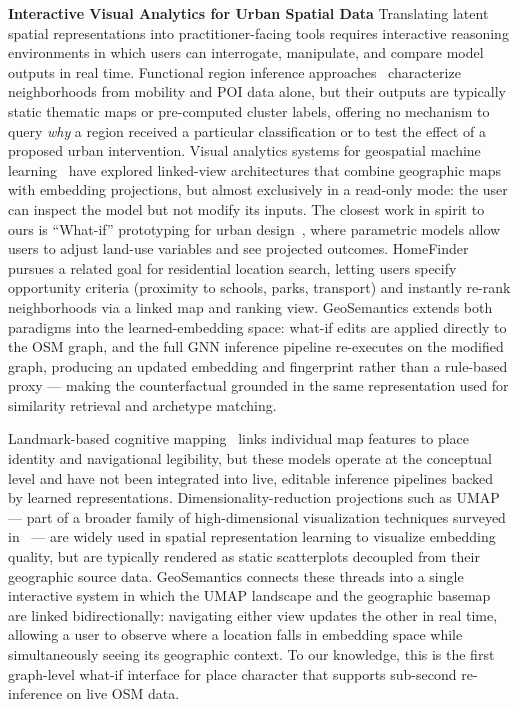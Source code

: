 \documentclass[]{interact}
\theoremstyle{plain}%
\theoremstyle{definition}
\theoremstyle{remark}
\begin{document}
\textbf{Interactive Visual Analytics for Urban Spatial Data}
Translating latent spatial representations into practitioner-facing tools requires interactive reasoning environments in which users can interrogate, manipulate, and compare model outputs in real time. Functional region inference approaches~\citep{10.1145/2339530.2339561, luo2022urbanregionprofilingmultigraph} characterize neighborhoods from mobility and POI data alone, but their outputs are typically static thematic maps or pre-computed cluster labels, offering no mechanism to query \emph{why} a region received a particular classification or to test the effect of a proposed urban intervention. Visual analytics systems for geospatial machine learning~\citep{Andrienko2021} have explored linked-view architectures that combine geographic maps with embedding projections, but almost exclusively in a read-only mode: the user can inspect the model but not modify its inputs. The closest work in spirit to ours is ``What-if'' prototyping for urban design~\citep{Miao2018}, where parametric models allow users to adjust land-use variables and see projected outcomes. HomeFinder~\citep{10.1145/3173574.3173821} pursues a related goal for residential location search, letting users specify opportunity criteria (proximity to schools, parks, transport) and instantly re-rank neighborhoods via a linked map and ranking view. GeoSemantics extends both paradigms into the learned-embedding space: what-if edits are applied directly to the OSM graph, and the full GNN inference pipeline re-executes on the modified graph, producing an updated embedding and fingerprint rather than a rule-based proxy --- making the counterfactual grounded in the same representation used for similarity retrieval and archetype matching.

Landmark-based cognitive mapping~\citep{lynch1960image, Caduff, 10.1007/3-540-45799-2_17} links individual map features to place identity and navigational legibility, but these models operate at the conceptual level and have not been integrated into live, editable inference pipelines backed by learned representations. Dimensionality-reduction projections such as UMAP~\citep{mcinnes2020umapuniformmanifoldapproximation} --- part of a broader family of high-dimensional visualization techniques surveyed in~\citet{liu2017visual} --- are widely used in spatial representation learning to visualize embedding quality, but are typically rendered as static scatterplots decoupled from their geographic source data. GeoSemantics connects these threads into a single interactive system in which the UMAP landscape and the geographic basemap are linked bidirectionally: navigating either view updates the other in real time, allowing a user to observe where a location falls in embedding space while simultaneously seeing its geographic context. To our knowledge, this is the first graph-level what-if interface for place character that supports sub-second re-inference on live OSM data.
\end{document}
